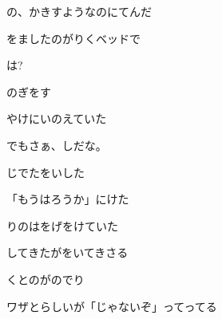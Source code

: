 \documentclass[a4paper,tate,twocolumn,12pt]{ltjtarticle}
\begin{document}
\begin{flushleft}
\begin{minipage}{\linewidth}
の、かきすようなのにてんだ
\end{minipage}

\vspace{2em}

\noindent\begin{minipage}{\linewidth}
をましたのがりくベッドで

は?
\end{minipage}

\vspace{2em}

\noindent\begin{minipage}{\linewidth}
のぎをす

やけにいのえていた
\end{minipage}

\vspace{2em}

\noindent\begin{minipage}{\linewidth}
でもさぁ、しだな。

じでたをいした

「もうはろうか」にけた

りのはをげをけていた
\end{minipage}

\vspace{2em}

\noindent\begin{minipage}{\linewidth}
してきたがをいてきさる

くとのがのでり

ワザとらしいが「じゃないぞ」ってってる


\end{minipage}
\end{flushleft}
\end{document}
